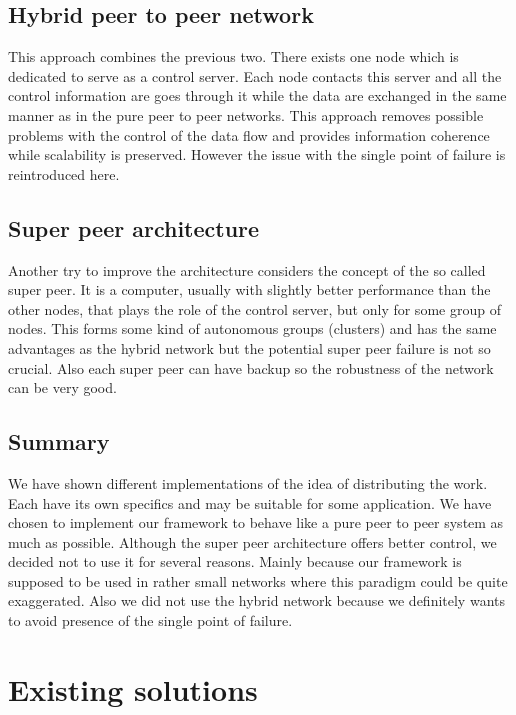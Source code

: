 \subsection*{Hybrid peer to peer network}

This approach combines the previous two. There exists one node which is
dedicated to serve as a control server. Each node contacts this server
and all the control information are goes through it while the data are
exchanged in the same manner as in the pure peer to peer networks. This
approach removes possible problems with the control of the data flow and
provides information coherence while scalability is preserved. However
the issue with the single point of failure is reintroduced here.

\subsection*{Super peer architecture}

Another try to improve the architecture considers the concept of the so
called super peer. It is a computer, usually with slightly better
performance than the other nodes, that plays the role of the control
server, but only for some group of nodes. This forms some kind of
autonomous groups (clusters) and has the same advantages as the hybrid
network but the potential super peer failure is not so crucial. Also
each super peer can have backup so the robustness of the network can be
very good.

\subsection{Summary}\label{summary}

We have shown different implementations of the idea of distributing the
work. Each have its own specifics and may be suitable for some
application. We have chosen to implement our framework to behave like a
pure peer to peer system as much as possible. Although the super peer
architecture offers better control, we decided not to use it for several
reasons. Mainly because our framework is supposed to be used in rather
small networks where this paradigm could be quite exaggerated. Also we
did not use the hybrid network because we definitely wants to avoid
presence of the single point of failure.

\section{Existing solutions}\label{existing-solutions}

